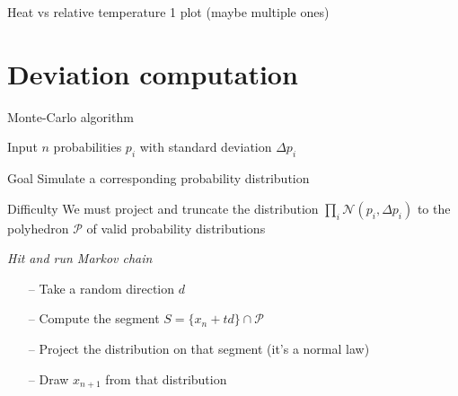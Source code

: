 \documentclass{beamer}
\begin{document}
\begin{frame}{Heat vs relative temperature}
  1 plot (maybe multiple ones)
\end{frame}



\section{Deviation computation}

\begin{frame}{Monte-Carlo algorithm}

  \vspace{0.5mm}

  \begin{block}{Input}
    $n$ probabilities $p_i$ with standard deviation $\Delta p_i$
  \end{block}

  \pause{}
  \begin{block}{Goal}
    Simulate a corresponding probability distribution
  \end{block}

  \pause{}
  \begin{block}{Difficulty}
    We must project and truncate the distribution $\prod_i
    \mathcal{N}(p_i,\Delta p_i)$ to the polyhedron $\mathcal{P}$ of valid probability distributions
  \end{block}

  \pause{}
  \emph{Hit and run Markov chain}
  \begin{itemize}
  \item[--] Take a random direction $d$
  \item[--] Compute the segment $S = \{x_n + t d\} \cap \mathcal{P}$
  \item[--] Project the distribution on that segment (it's a normal law)
  \item[--] Draw $x_{n+1}$ from that distribution
  \end{itemize}

\end{frame}
\end{document}
